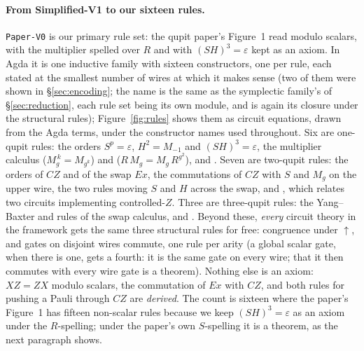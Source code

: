 \paragraph{From Simplified-V1 to our sixteen rules.}
\texttt{Paper-V0} is our primary rule set: the qupit paper's Figure~1
read modulo scalars, with the multiplier spelled over $R$ and with
$(SH)^3 = \varepsilon$ kept as an axiom.  In Agda it is one inductive
family  with sixteen constructors, one per rule,
each stated at the smallest number of wires at which it makes sense
(two of them were shown in \S\ref{sec:encoding}; the name is the same
as the symplectic family's of \S\ref{sec:reduction}, each rule set
being its own module, and  is again its
closure under the structural rules);
Figure~\ref{fig:rules} shows them as circuit equations, drawn from the
Agda terms, under the constructor names used throughout.  Six are
one-qupit rules: the orders $S^{p} = \varepsilon$, $H^{2} = M_{-1}$ and
$(SH)^{3} = \varepsilon$, the multiplier calculus 
($M_g^{\,k} = M_{g^k}$) and  ($R\,M_g = M_g\,R^{g^2}$),
and .  Seven are two-qupit rules: the orders of $CZ$
and of the swap $\mathit{Ex}$, the commutations of $CZ$ with $S$ and
$M_g$ on the upper wire, the two rules moving $S$ and $H$ across the
swap, and , which relates two circuits implementing
controlled-$Z$.  Three are three-qupit rules: the Yang--Baxter and
 rules of the swap calculus, and .
Beyond these, \emph{every} circuit theory in
the framework gets the same three structural rules for free: congruence
under $\uparrow$, and gates on disjoint wires commute, one rule per
arity (a global scalar gate, when there is one, gets a fourth: it is
the same gate on every wire; that it then commutes with every wire
gate is a theorem).  Nothing else is an
axiom: $XZ = ZX$ modulo scalars, the commutation of $\mathit{Ex}$ with
$CZ$, and both rules for pushing a Pauli through $CZ$ are \emph{derived}.
The count is sixteen where the paper's Figure~1 has fifteen non-scalar
rules because we keep $(SH)^3 = \varepsilon$ as an axiom under the
$R$-spelling; under the paper's own $S$-spelling it is a theorem, as
the next paragraph shows.


